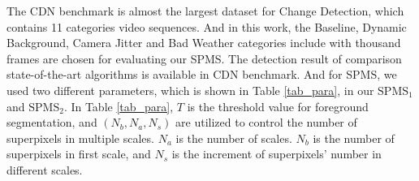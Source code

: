 \documentclass[runningheads,a4paper]{llncs}
\newcommand{\reftab}[1]{Table \ref{#1}}
\begin{document}
The CDN \cite{2014_CVPR_CDnet_Wang} benchmark is almost the largest dataset for
Change Detection, which contains 11 categories video sequences.
And in this work, the Baseline, Dynamic Background, Camera Jitter and
Bad Weather categories include with thousand frames are chosen for
evaluating our SPMS.
The detection result of comparison state-of-the-art algorithms is available in
CDN \cite{2014_CVPR_CDnet_Wang} benchmark. And for SPMS, we used two different
parameters, which is shown in \reftab{tab_para}, in our $\text{SPMS}_1$ and
$\text{SPMS}_2$.
In \reftab{tab_para}, $T$ is the threshold value for foreground segmentation,
and $(N_{b},N_{a},N_{s})$ are utilized to control the number of superpixels in
multiple scales. $N_{a}$ is the number of scales. $N_{b}$ is the number of
superpixels in first scale, and $N_{s}$ is the increment of superpixels' number
in different scales.
\end{document}
